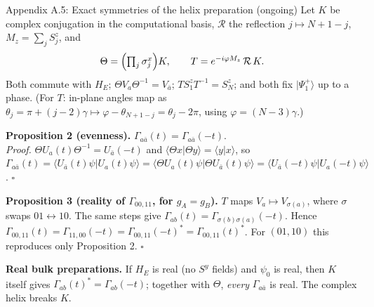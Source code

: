 \documentclass[aspectratio=169,11pt]{beamer}
\newcommand{\ket}[1]{\lvert #1\rangle}
\begin{document}
\begin{frame}{Appendix A.5: Exact symmetries of the helix preparation (ongoing)}
\footnotesize
Let $K$ be complex conjugation in the computational basis, $\mathcal R$ the reflection $j\mapsto N+1-j$, $M_z=\sum_jS^z_j$, and
\[
\Theta=\Bigl(\textstyle\prod_j\sigma^x_j\Bigr)K,\qquad T=e^{-i\varphi M_z}\,\mathcal R\,K .
\]
Both commute with $H_E$; $\Theta V_a\Theta^{-1}=V_{\bar a}$; $TS^z_1T^{-1}=S^z_N$; and both fix $\ket{\Psi_1^+}$ up to a phase. (For $T$: in-plane angles map as $\theta_j=\pi+(j-2)\gamma\mapsto\varphi-\theta_{N+1-j}=\theta_j-2\pi$, using $\varphi=(N-3)\gamma$.)
\medskip

\textbf{Proposition 2 (evenness).} $\Gamma_{a\bar a}(t)=\Gamma_{a\bar a}(-t)$.\\
\emph{Proof.} $\Theta U_a(t)\Theta^{-1}=U_{\bar a}(-t)$ and $\langle\Theta x\vert\Theta y\rangle=\langle y\vert x\rangle$, so
$\Gamma_{a\bar a}(t)=\langle U_{\bar a}(t)\psi\vert U_a(t)\psi\rangle=\langle\Theta U_a(t)\psi\vert\Theta U_{\bar a}(t)\psi\rangle=\langle U_{\bar a}(-t)\psi\vert U_a(-t)\psi\rangle$. $\square$
\medskip

\textbf{Proposition 3 (reality of $\Gamma_{00,11}$, for $g_A=g_B$).} $T$ maps $V_a\mapsto V_{\sigma(a)}$, where $\sigma$ swaps $01\leftrightarrow10$. The same steps give $\Gamma_{ab}(t)=\Gamma_{\sigma(b)\sigma(a)}(-t)$. Hence $\Gamma_{00,11}(t)=\Gamma_{11,00}(-t)=\Gamma_{00,11}(-t)^*=\Gamma_{00,11}(t)^*$. For $(01,10)$ this reproduces only Proposition 2. $\square$
\medskip

\textbf{Real bulk preparations.} If $H_E$ is real (no $S^y$ fields) and $\psi_0$ is real, then $K$ itself gives $\Gamma_{ab}(t)^*=\Gamma_{ab}(-t)$; together with $\Theta$, \emph{every} $\Gamma_{a\bar a}$ is real. The complex helix breaks $K$.
\end{frame}
\end{document}
